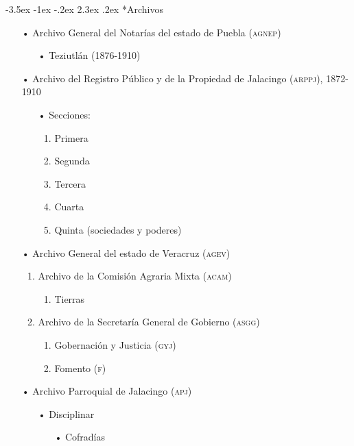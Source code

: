\documentclass[14pt,twoside,final]{extbook} %
\makeatletter
\renewcommand\section{\@startsection {section}{1}{\z@}%
                                     {-3.5ex \@plus -1ex \@minus -.2ex}%
                                     {2.3ex \@plus .2ex}%
                                     {\normalfont\large\bfseries\sc}}
\makeatother
\begin{document}
\section*{Archivos}\label{sec:archivos}
\begin{itemize}[noitemsep]
\item[•]Archivo General del Notarías del estado de Puebla (\textsc{agnep})
\begin{itemize}
\item[•]Teziutlán (1876-1910)
\end{itemize}
\end{itemize}
\begin{itemize}[noitemsep]
\item[•]Archivo del Registro Público y de la Propiedad de Jalacingo (\textsc{arppj}), 1872-1910
\begin{itemize}[noitemsep]
\item[•]Secciones:
\begin{enumerate}[noitemsep]
\item Primera
\item Segunda
\item Tercera
\item Cuarta
\item Quinta (sociedades y poderes)
\end{enumerate}
\end{itemize}
\end{itemize}
\begin{itemize}[noitemsep]
\item[•]Archivo General del estado de Veracruz (\textsc{agev})
\begin{enumerate}[noitemsep]
\item Archivo de la Comisión Agraria Mixta (\textsc{acam})
\begin{enumerate}[noitemsep]
\item Tierras
\end{enumerate}
\item Archivo de la Secretaría General de Gobierno (\textsc{asgg})
\begin{enumerate}[noitemsep]
\item Gobernación y Justicia (\textsc{gyj})
\item Fomento (\textsc{f})
\end{enumerate}
\end{enumerate}
\end{itemize}
\begin{itemize}[noitemsep]
\item[•]Archivo Parroquial de Jalacingo (\textsc{apj})
\begin{itemize}[noitemsep]
\item[•]Disciplinar
\begin{itemize}[noitemsep]
\item[•]Cofradías
\end{itemize}
\end{itemize}
\end{itemize}
\end{document}
